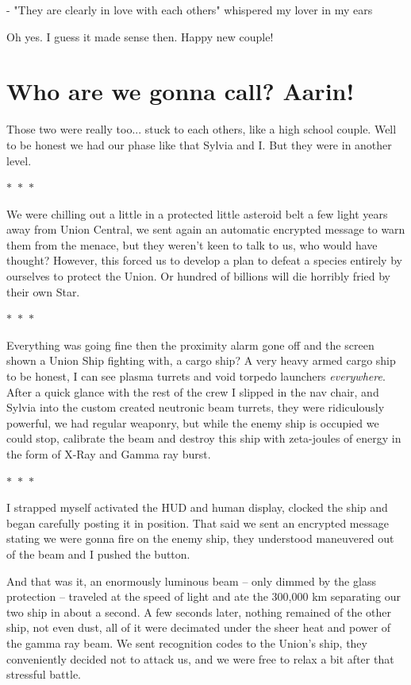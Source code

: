\documentclass[colorlinks,12pt,a4paper]{book}
\newcommand\sep{\begin{center}
  \boldmath $\ast$~$\ast$~$\ast$
\end{center}}
\begin{document}
 - "They are clearly in love with each others" whispered my lover in my ears\par 
 \bigskip
 Oh yes. I guess it made sense then. Happy new couple!
 
 \chapter{Who are we gonna call? Aarin!}
\par 
\bigskip

Those two were really too... stuck to each others, like a high school couple. Well to be honest we had our phase like that Sylvia 
and I. But they were in another level. \sep 
\bigskip
We were chilling out a little in a protected little asteroid belt a few light years away from Union Central, we sent again an automatic 
encrypted message to warn them from the menace, but they weren't keen to talk to us, who would have thought? However, this forced us to 
develop a plan to defeat a species entirely by ourselves to protect the Union. Or hundred of billions will die horribly fried by their own
Star.

\sep 

Everything was going fine then the proximity alarm gone off and the screen shown a Union Ship fighting with, a cargo ship? A very 
heavy armed cargo ship to be honest, I can see plasma turrets and void torpedo launchers \textit{everywhere}. After a quick glance with 
the rest of the crew I slipped in the nav chair, and Sylvia into the custom created neutronic beam turrets, they were ridiculously powerful,
we had regular weaponry, but while the enemy ship is occupied we could stop, calibrate the beam and destroy this ship with
zeta-joules of energy in the form of X-Ray and Gamma ray burst.\sep 
\bigskip

I strapped myself activated the HUD and human display, clocked the ship and began carefully posting it in position. That said we sent an 
encrypted message stating we were gonna fire on the enemy ship, they understood maneuvered out of the beam and I pushed the button.\par 
\bigskip

And that was it, an enormously luminous beam -- only dimmed by the glass protection -- traveled at the speed of light and ate the 300,000 km
separating our two ship in about a second. A few seconds later, nothing remained of the other ship, not even dust, all of it were decimated 
under the sheer heat and power of the gamma ray beam. We sent recognition codes to the Union's ship, they conveniently decided not to attack us, 
and we were free to relax a bit after that stressful battle.
\end{document}
